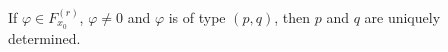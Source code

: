 If $\varphi \in F_{x_0}^{(r)}$, $\varphi \neq 0$ and $\varphi$ is of type $(p, q)$, then $p$ and $q$ are uniquely determined.
